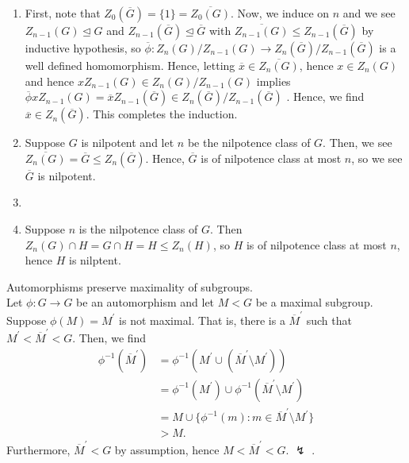 \documentclass[a4paper]{article}
\begin{document}
\begin{solution}[1]
\begin{enumerate}
			\item  First, note that \(Z_0 \left( \overline{G} \right) = \{1\} = \overline{Z_0\left( G \right) }\). Now, we induce on \(n\) and we see \(Z_{n-1}\left( G \right) \trianglelefteq G\)  and \(Z_{n-1}\left( \overline{G} \right) \trianglelefteq \overline{G}\) with \(\overline{Z_{n-1}\left( G \right) } \le Z_{n-1}\left( \overline{G} \right) \) by inductive hypothesis,  so \(\overline{\phi}: Z_{n}\left( G \right) / Z_{n-1}\left( G \right)  \to Z_{n}\left( \overline{G} \right) / Z_{n-1}\left( \overline{G} \right) \) is a well defined homomorphism. Hence, letting \(\overline{x} \in \overline{Z_{n}\left( G \right) }\), hence \(x \in Z_{n}\left( G \right) \) and hence \(xZ_{n-1}\left( G \right)  \in Z_{n}\left( G \right) / Z_{n-1}\left( G \right) \)  implies \(\overline{\phi}xZ_{n-1}\left( G \right)  = \overline{x}Z_{n-1}\left( \overline{G} \right) \in Z_{n}\left( \overline{G} \right) / Z_{n-1}\left( \overline{G} \right)  \) . Hence, we find \(\overline{x} \in Z_{n}\left( \overline{G} \right) \). This completes the induction.
			\item Suppose \(G\) is nilpotent and let \(n\) be the nilpotence class of \(G\). Then, we see \(\overline{Z_{n}\left( G \right) } = \overline{G} \le Z_{n}\left( \overline{G} \right) \). Hence, \(\overline{G}\) is of nilpotence class at most \(n\), so we see \(\overline{G}\) is nilpotent.
				\item
			\item Suppose \(n\) is the nilpotence class of \(G\). Then \(Z_{n}\left( G \right) \cap H = G \cap H = H \le Z_{n}\left( H \right) \), so \(H\) is of nilpotence class at most \(n\), hence \(H\) is nilptent.


\end{enumerate}
\end{solution}
\newpage
\begin{lemma}
	Automorphisms preserve maximality of subgroups.\\
	Let \(\phi :G \to G\)  be an automorphism and let \(M < G\)  be a maximal subgroup. Suppose \(\phi\left( M \right) = M^{\prime} \) is not maximal. That is, there is a \(\overline{M}^{\prime}\)  such that \(M^{\prime} < \overline{M}^{\prime} < G\). Then, we find
	\begin{align*}
		\phi ^{-1}\left( \overline{M}^{\prime} \right) &=  \phi ^{-1} \left( M^{\prime} \cup \left( \overline{M}^{\prime} \setminus M^{\prime} \right)\right)  \\
							       &= \phi ^{-1}\left( M^{\prime} \right) \cup \phi ^{-1}\left( \overline{M}^{\prime} \setminus M^{\prime}\right)  \\
							       &= M \cup \{\phi^{-1}\left( m \right) : m \in \overline{M}^{\prime} \setminus M^{\prime}\}  \\
							       &> M
	.\end{align*}
Furthermore, \(\overline{M}^{\prime} < G\)  by assumption, hence \(M < \overline{M}^{\prime} < G\). \(\lightning\) .
\end{lemma}
\end{document}
